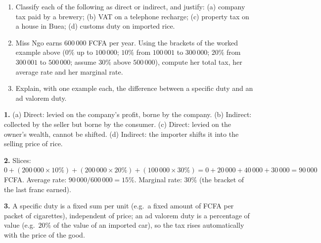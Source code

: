 \documentclass[11pt]{article}
\begin{document}
\begin{exercice}
\begin{enumerate}
\item Classify each of the following as direct or indirect, and justify: (a) company tax paid by a brewery; (b) VAT on a telephone recharge; (c) property tax on a house in Buea; (d) customs duty on imported rice.
\item Miss Ngo earns $600\,000$ FCFA per year. Using the brackets of the worked example above ($0\%$ up to $100\,000$; $10\%$ from $100\,001$ to $300\,000$; $20\%$ from $300\,001$ to $500\,000$; assume $30\%$ above $500\,000$), compute her total tax, her average rate and her marginal rate.
\item Explain, with one example each, the difference between a specific duty and an ad valorem duty.
\end{enumerate}
\end{exercice}

\begin{corrige}
\textbf{1.} (a) Direct: levied on the company's profit, borne by the company. (b) Indirect: collected by the seller but borne by the consumer. (c) Direct: levied on the owner's wealth, cannot be shifted. (d) Indirect: the importer shifts it into the selling price of rice. \par
\textbf{2.} Slices: $0 + (200\,000 \times 10\%) + (200\,000 \times 20\%) + (100\,000 \times 30\%) = 0 + 20\,000 + 40\,000 + 30\,000 = 90\,000$ FCFA. Average rate: $90\,000/600\,000 = 15\%$. Marginal rate: $30\%$ (the bracket of the last franc earned). \par
\textbf{3.} A specific duty is a fixed sum per unit (e.g.\ a fixed amount of FCFA per packet of cigarettes), independent of price; an ad valorem duty is a percentage of value (e.g.\ $20\%$ of the value of an imported car), so the tax rises automatically with the price of the good.
\end{corrige}
\end{document}
